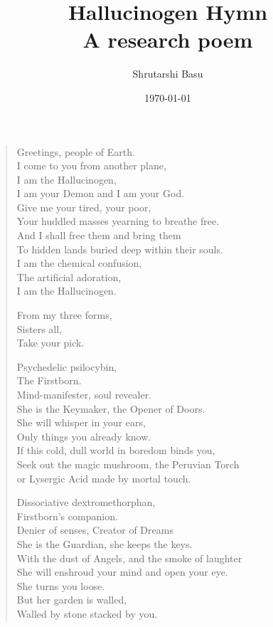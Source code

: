 \documentclass[12pt,letterpaper]{article}
\title{Hallucinogen Hymn\\ A research poem}
\author{Shrutarshi Basu}
\date{\today}
\begin{document}
\maketitle
\begin{verse}
Greetings, people of Earth.\\
I come to you from another plane,\\
I am the Hallucinogen,\\
I am your Demon and I am your God.\\
Give me your tired, your poor,\\
Your huddled masses yearning to breathe free.\\
And I shall free them and bring them\\
To hidden lands buried deep within their souls.\\
I am the chemical confusion,\\
The artificial adoration,\\
I am the Hallucinogen.

From my three forms,\\
Sisters all,\\
Take your pick.

Psychedelic psilocybin,\\
The Firstborn.\\
Mind-manifester, soul revealer.\\
She is the Keymaker, the Opener of Doors.\\
She will whisper in your ears,\\
Only things you already know.\\
If this cold, dull world in boredom binds you,\\
Seek out the magic mushroom, the Peruvian Torch\\
or Lysergic Acid made by mortal touch.

Dissociative dextromethorphan,\\
Firstborn's companion.\\
Denier of senses, Creator of Dreams\\
She is the Guardian, she keeps the keys.\\
With the dust of Angels, and the smoke of laughter\\
She will enshroud your mind and open your eye.\\
She turns you loose.\\
But her garden is walled,\\
Walled by stone stacked by you.


\end{verse}
\end{document}
